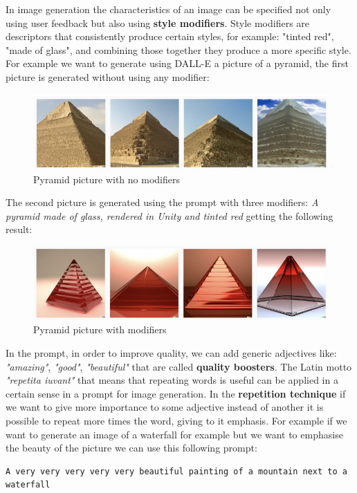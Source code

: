 In image generation the characteristics of an image can be specified not only using user feedback but also using \textbf{style modifiers}. Style modifiers are  descriptors that consistently produce certain styles, for example: "tinted red", "made of glass", and combining those together they produce a more specific style. \cite{lp_style} 
For example we want to generate using DALL-E a picture of a pyramid, the first picture is generated without using any modifier:
\begin{figure}[H]
    \centering
    \includegraphics[width=0.9\linewidth]{Figures/fig_11.png}
    \caption{Pyramid picture with no modifiers}
    \label{fig:enter-label}
\end{figure}
The second picture is generated using the prompt with three modifiers: \textit{A pyramid made of glass, rendered in Unity and tinted red} getting the following result:
\begin{figure}[H]
    \centering
    \includegraphics[width=0.9\linewidth]{Figures/fig_12.png}
    \caption{Pyramid picture with modifiers}
    \label{fig:enter-label}
\end{figure}
In the prompt, in order to improve quality, we can add generic adjectives like: \textit{"amazing"}, \textit{"good"}, \textit{"beautiful"} that are called \textbf{quality boosters}. \cite{oppenlaender2023taxonomy} 
The Latin motto \textit{"repetita iuvant"} that means that repeating words is useful can be applied in a certain sense in a prompt for image generation. In the \textbf{repetition technique} if we want to give more importance to some adjective instead of another it is possible to repeat more times the word, giving to it emphasis. For example if we want to generate an image of a waterfall for example but we want to emphasise the beauty of the picture we can use this following prompt:
\begin{lstlisting}
A very very very very very beautiful painting of a mountain next to a waterfall
\end{lstlisting}
